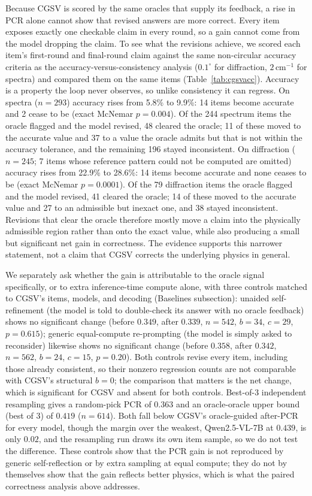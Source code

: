 \documentclass[pdflatex,sn-nature]{sn-jnl}
\newcommand{\rev}[1]{#1}
\newcommand{\rev}[1]{{\color{blue}#1}}
\begin{document}
\rev{Because CGSV is scored by the same oracles that supply its feedback, a rise in PCR alone cannot
show that revised answers are more correct. Every item exposes exactly one checkable claim in
every round, so a gain cannot come from the model dropping the claim. To see what the revisions
achieve, we scored each item's first-round and final-round claim against the same non-circular
accuracy criteria as the accuracy-versus-consistency analysis ($0.1^\circ$ for diffraction,
$2\,\mathrm{cm}^{-1}$ for spectra) and compared them on the same items (Table~\ref{tab:cgsvacc}).
Accuracy is a property the loop never observes, so unlike consistency it can regress. On spectra
($n=293$) accuracy rises from 5.8\% to 9.9\%: 14 items become accurate and 2 cease to be (exact
McNemar $p=0.004$). Of the 244 spectrum items the oracle flagged and the model revised, 48 cleared
the oracle; 11 of these moved to the accurate value and 37 to a value the oracle admits but that
is not within the accuracy tolerance, and the remaining 196 stayed inconsistent.
On diffraction ($n=245$; 7 items whose reference pattern could not be computed are omitted) accuracy
rises from 22.9\% to 28.6\%: 14 items become accurate and none ceases to be (exact McNemar $p=0.0001$).
Of the 79 diffraction items the oracle flagged and the model revised, 41 cleared the oracle; 14 of these
moved to the accurate value and 27 to an admissible but inexact one, and 38 stayed inconsistent. Revisions that clear
the oracle therefore mostly move a claim into the physically admissible region rather than onto the
exact value, while also producing a small but significant net gain in correctness. The evidence
supports this narrower statement, not a claim that CGSV corrects the underlying physics in general.}

\rev{We separately ask whether the gain is}
attributable to the oracle signal specifically, or to extra inference-time compute alone,
with three controls matched to CGSV's items, models, and decoding
(Baselines subsection): unaided self-refinement (the model is told to double-check its
answer with no oracle feedback) shows no significant change (before $0.349$, after $0.339$, $n=542$, $b=34$, $c=29$, $p=0.615$);
generic equal-compute re-prompting (the model is simply asked to reconsider) likewise shows
no significant change (before $0.358$, after $0.342$, $n=562$, $b=24$, $c=15$, $p=0.20$). \rev{Both
controls revise every item, including those already consistent, so their nonzero regression counts
are not comparable with CGSV's structural $b=0$; the comparison that matters is the net change,
which is significant for CGSV and absent for both controls.} Best-of-3 independent resampling gives a
random-pick PCR of $0.363$ and an oracle-oracle upper bound (best of 3) of $0.419$
($n=614$). Both fall below CGSV's oracle-guided after-PCR for every model, though the
margin over the weakest, Qwen2.5-VL-7B at $0.439$, is only $0.02$, and the resampling run
draws its own item sample, so we do not test the difference. \rev{These controls show that the PCR gain
is not reproduced by generic self-reflection or by extra sampling at equal compute; they do not
by themselves show that the gain reflects better physics, which is what the paired correctness
analysis above addresses.}
\end{document}
